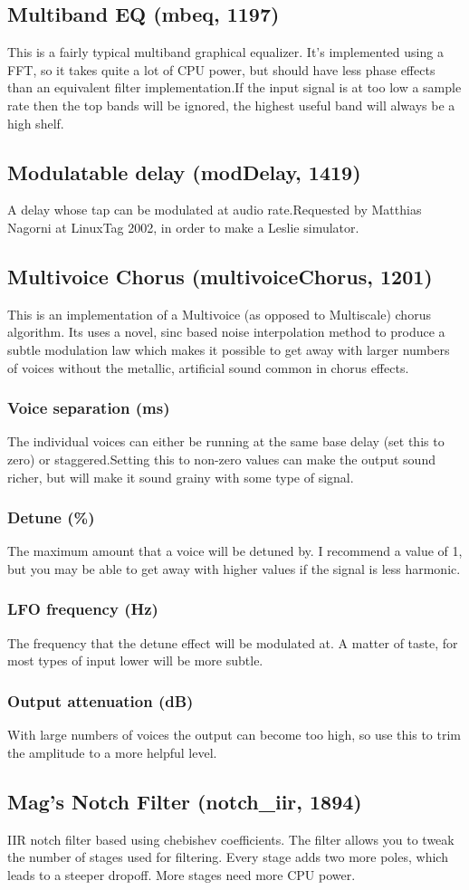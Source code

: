 \documentclass[11pt]{article}
\begin{document}
\subsection{Multiband EQ (mbeq, 1197)\label{mbeq}\label{id1197}}
This is a fairly typical multiband graphical equalizer. It's implemented using a FFT, so it takes quite a lot of CPU power, but should have less phase effects than an equivalent filter implementation.If the input signal is at too low a sample rate then the top bands will be ignored, the highest useful band will always be a high shelf.\subsection{Modulatable delay (modDelay, 1419)\label{modDelay}\label{id1419}}
A delay whose tap can be modulated at audio rate.Requested by Matthias Nagorni at LinuxTag 2002, in order to make a Leslie simulator.\subsection{Multivoice Chorus (multivoiceChorus, 1201)\label{multivoiceChorus}\label{id1201}}
This is an implementation of a Multivoice (as opposed to Multiscale) chorus algorithm. Its uses a novel, sinc based noise interpolation method to produce a subtle modulation law which makes it possible to get away with larger numbers of voices without the metallic, artificial sound common in chorus effects.\subsubsection*{Voice separation (ms)}
The individual voices can either be running at the same base delay (set this to zero) or staggered.Setting this to non-zero values can make the output sound richer, but will make it sound grainy with some type of signal.\subsubsection*{Detune (\%)}
The maximum amount that a voice will be detuned by. I recommend a value of 1, but you may be able to get away with higher values if the signal is less harmonic.\subsubsection*{LFO frequency (Hz)}
The frequency that the detune effect will be modulated at. A matter of taste, for most types of input lower will be more subtle.\subsubsection*{Output attenuation (dB)}
With large numbers of voices the output can become too high, so use this to trim the amplitude to a more helpful level.\subsection{Mag's Notch Filter (notch\_iir, 1894)\label{notch_iir}\label{id1894}}
 IIR notch filter based using chebishev coefficients. The filter allows you to tweak the number of stages used for
                filtering. Every stage adds two more poles, which leads to a steeper dropoff. More stages need more CPU power.
\end{document}
